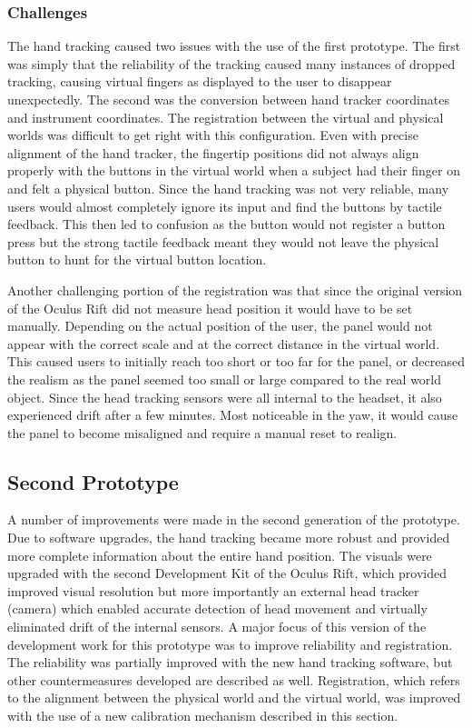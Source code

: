 \subsubsection{Challenges}

The hand tracking caused two issues with the use of the first prototype.
The first was simply that the reliability of the tracking caused many instances of dropped tracking, causing virtual fingers as displayed to the user to disappear unexpectedly.
The second was the conversion between hand tracker coordinates and instrument coordinates.
The registration between the virtual and physical worlds was difficult to get right with this configuration.
Even with precise alignment of the hand tracker, the fingertip positions did not always align properly with the buttons in the virtual world when a subject had their finger on and felt a physical button.
Since the hand tracking was not very reliable, many users would almost completely ignore its input and find the buttons by tactile feedback.
This then led to confusion as the button would not register a button press but the strong tactile feedback meant they would not leave the physical button to hunt for the virtual button location.

Another challenging portion of the registration was that since the original version of the Oculus Rift did not measure head position it would have to be set manually.
Depending on the actual position of the user, the panel would not appear with the correct scale and at the correct distance in the virtual world.
This caused users to initially reach too short or too far for the panel, or decreased the realism as the panel seemed too small or large compared to the real world object.
Since the head tracking sensors were all internal to the headset, it also experienced drift after a few minutes.
Most noticeable in the yaw, it would cause the panel to become misaligned and require a manual reset to realign.

\subsection{Second Prototype}

A number of improvements were made in the second generation of the prototype.
Due to software upgrades, the hand tracking became more robust and provided more complete information about the entire hand position.
The visuals were upgraded with the second Development Kit of the Oculus Rift, which provided improved visual resolution but more importantly an external head tracker (camera) which enabled accurate detection of head movement and virtually eliminated drift of the internal sensors.
A major focus of this version of the development work for this prototype was to improve reliability and registration.
The reliability was partially improved with the new hand tracking software, but other countermeasures developed are described as well.
Registration, which refers to the alignment between the physical world and the virtual world, was improved with the use of a new calibration mechanism described in this section.

